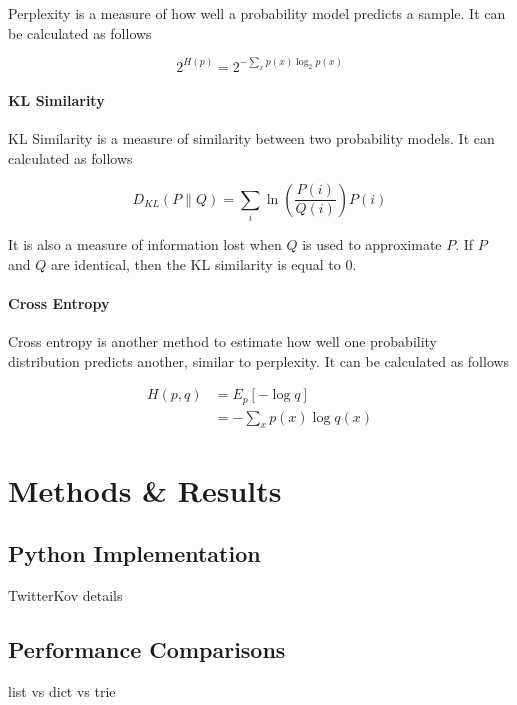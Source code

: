 \documentclass[11pt]{article}
\begin{document}
Perplexity is a measure of how well a probability model predicts a sample. It can be calculated as follows

$$ 2^{H\left(p\right)} = 2^{-\sum_x p\left(x\right) \log_2 p\left(x\right)}$$

\paragraph{KL Similarity}

KL Similarity is a measure of similarity between two probability models. It can calculated as follows

$$D_{KL}\left(P\|Q\right) = \sum\limits_i \ln\left(\frac{P\left(i\right)}{Q\left(i\right)}\right) P\left(i\right)$$

It is also a measure of information lost when $Q$ is used to approximate $P$. If $P$ and $Q$ are identical, then the KL similarity is equal to 0.

\paragraph{Cross Entropy}

Cross entropy is another method to estimate how well one probability distribution predicts another, similar to perplexity. It can be calculated as follows

\begin{align*}
H\left(p,q\right) &= E_p\left[-\log q\right] \\
&= -\sum_x p\left(x\right) \log q\left(x\right)
\end{align*}

\section{Methods \& Results}

\subsection{Python Implementation}

{\color{red} TwitterKov details}

\subsection{Performance Comparisons}

{\color{red} list vs dict vs trie}
\end{document}
